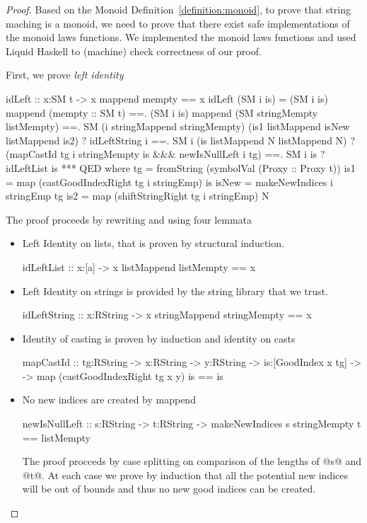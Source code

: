 \begin{proof}
Based on the Monoid Definition~\ref{definition:monoid},
to prove that string maching is a monoid, we need to prove that
there exist safe implementations of the monoid laws functions.
%
We implemented the monoid laws functions
and used Liquid Haskell to (machine) check correctness of our proof.

First, we prove \textit{left identity}
\begin{code}
idLeft :: x:SM t -> {x mappend mempty == x }
idLeft (SM i is)
  =  (SM i is) mappend (mempty :: SM t)
  ==. (SM i is) mappend (SM stringMempty listMempty)
  ==. SM (i stringMappend stringMempty) (is1 listMappend isNew listMappend is2)
      ? idLeftString i
  ==. SM i (is listMappend N listMappend N)
      ? (mapCastId tg i stringMempty is &&& newIsNullLeft i tg)
  ==. SM i is
      ? idLeftList is
  ***  QED
  where
    tg    = fromString (symbolVal (Proxy :: Proxy t))
    is1   = map (castGoodIndexRight tg i stringEmp) is
    isNew = makeNewIndices i stringEmp tg
    is2   = map (shiftStringRight tg i stringEmp) N
\end{code}
The proof proceeds by rewriting and using four lemmata
\begin{itemize}
\item Left Identity on lists, that is proven by structural induction.
\begin{code}
idLeftList :: x:[a] -> {x listMappend listMempty == x}
\end{code}
\item Left Identity on strings is provided by the string library that we trust.
\begin{code}
idLeftString :: x:RString -> {x stringMappend stringMempty == x}
\end{code}
\item Identity of casting is proven by induction and identity on casts
\begin{code}
mapCastId :: tg:RString -> x:RString -> y:RString
  -> is:[GoodIndex x tg] ->
  -> {map (castGoodIndexRight tg x y) is == is}
\end{code}
\item No new indices are created by mappend
\begin{code}
newIsNullLeft :: s:RString -> t:RString
  -> {makeNewIndices s stringMempty t == listMempty }
\end{code}
The proof procceds by case splitting
on comparison of the lengths of @s@ and @t@.
At each case we prove by induction that all
the potential new indices will be out of bounds and thus
no new good indices can be created.
\end{itemize}


\end{proof}

